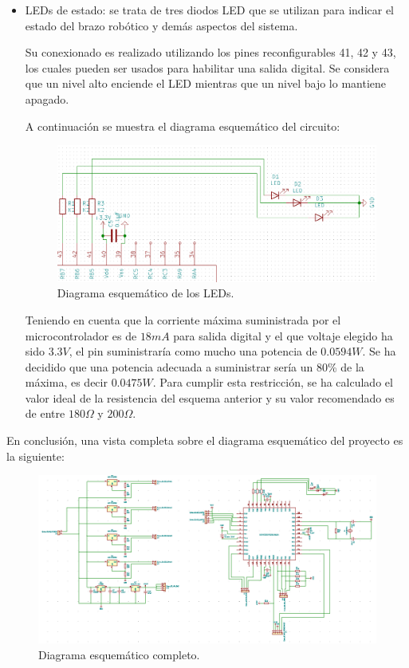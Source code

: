 \begin{itemize}
    
    \item LEDs de estado: se trata de tres diodos LED que se utilizan para indicar el estado del brazo robótico y demás aspectos del sistema. 
    
    Su conexionado es realizado utilizando los pines reconfigurables 41, 42 y 43, los cuales pueden ser usados para habilitar una salida digital. Se considera que un nivel alto enciende el LED mientras que un nivel bajo lo mantiene apagado.
    
    A continuación se muestra el diagrama esquemático del circuito:
    
    \begin{figure}[H]
    \centering 
    \includegraphics[width=.75\linewidth]{pictures/LEDS.PNG}
    \caption{Diagrama esquemático de los LEDs.}
    \label{fig:CAMBIAR!!!!!!!!!!}
    \end{figure}

    Teniendo en cuenta que la corriente máxima suministrada por el microcontrolador es de $18mA$ para salida digital y el que voltaje elegido ha sido $3.3V$, el pin suministraría como mucho una potencia de $0.0594W$. Se ha decidido que una potencia adecuada a suministrar sería un 80\% de la máxima, es decir $0.0475W$. Para cumplir esta restricción, se ha calculado el valor ideal de la resistencia del esquema anterior y su valor recomendado es de entre $180 \Omega$ y $200 \Omega$.
    
\end{itemize}

En conclusión, una vista completa sobre el diagrama esquemático del proyecto es la siguiente:

    \begin{figure}[H]
    \centering 
    \includegraphics[width=\linewidth]{pictures/EsquematicoCompleto.PNG}
    \caption{Diagrama esquemático completo.}
    \label{fig:CAMBIAR!!!!!!!!!!}
    \end{figure}

